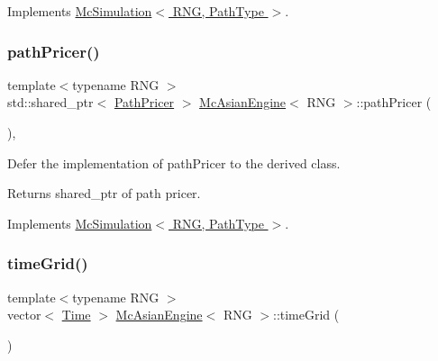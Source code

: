 Implements \hyperlink{class_mc_simulation_ad2338ca624a9bbfaec8e4d882471d546}{Mc\+Simulation$<$ R\+N\+G, Path\+Type $>$}.

\hypertarget{class_mc_asian_engine_a5b7351c28b68878b7f6d130eef293d6c}{}\label{class_mc_asian_engine_a5b7351c28b68878b7f6d130eef293d6c} 
\subsubsection{\texorpdfstring{path\+Pricer()}{pathPricer()}}
{\footnotesize\ttfamily template$<$typename R\+NG $>$ \\
std\+::shared\+\_\+ptr$<$ \hyperlink{class_path_pricer}{Path\+Pricer} $>$ \hyperlink{class_mc_asian_engine}{Mc\+Asian\+Engine}$<$ R\+NG $>$\+::path\+Pricer (\begin{DoxyParamCaption}{ }\end{DoxyParamCaption})\hspace{0.3cm}{\ttfamily [override]}, {\ttfamily [virtual]}}



Defer the implementation of path\+Pricer to the derived class. 

\begin{DoxyReturn}{Returns}
shared\+\_\+ptr of path pricer. 
\end{DoxyReturn}


Implements \hyperlink{class_mc_simulation_a4d755ea777c2f3a2ec2fcc70acf71a6d}{Mc\+Simulation$<$ R\+N\+G, Path\+Type $>$}.

\hypertarget{class_mc_asian_engine_ad8d2c8721172ab1d7327db91a26c5052}{}\label{class_mc_asian_engine_ad8d2c8721172ab1d7327db91a26c5052} 
\subsubsection{\texorpdfstring{time\+Grid()}{timeGrid()}}
{\footnotesize\ttfamily template$<$typename R\+NG $>$ \\
vector$<$ \hyperlink{_name_def_8h_ac2d3e0ba793497bcca555c7c2cf64ff3}{Time} $>$ \hyperlink{class_mc_asian_engine}{Mc\+Asian\+Engine}$<$ R\+NG $>$\+::time\+Grid (\begin{DoxyParamCaption}{ }\end{DoxyParamCaption})\hspace{0.3cm}{\ttfamily [override]}}



